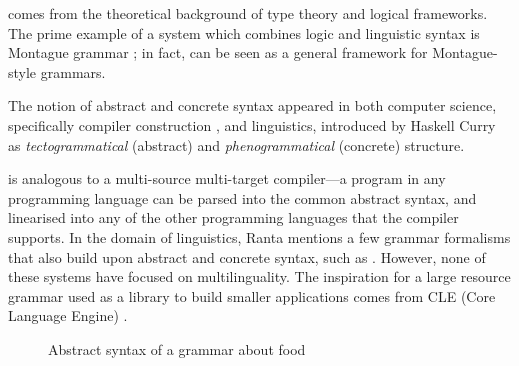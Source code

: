\gf{} comes from the theoretical background of type theory and logical
frameworks. The prime example of a system which combines logic and
linguistic syntax is Montague grammar \cite{montague}; in fact, \gf{}
can be seen as a general framework for Montague-style grammars.

The notion of abstract and concrete syntax appeared in both computer
science, specifically compiler construction \cite{mccarthy62}, and
linguistics, introduced by Haskell Curry \cite{curry1961} as
\emph{tectogrammatical} (abstract) and \emph{phenogrammatical}
(concrete) structure.

\gf{} is analogous to a multi-source multi-target compiler---a program
in any programming language can be parsed into the common abstract
syntax, and linearised into any of the other programming languages
that the compiler supports.  In the domain of linguistics, Ranta
\cite{ranta2011gfbook} mentions a few grammar formalisms that also
build upon abstract and concrete syntax, such as
\cite{deGroote2001acg,pollard2004hog,muskens2001lambda}. However, none
of these systems have focused on multilinguality.
The inspiration for a large resource grammar used as a library to
build smaller applications comes from  CLE (Core Language Engine)
\cite{CLE,cle2}.


\begin{figure}[h]
\centering

\begin{Shaded}
\begin{Highlighting}[]
 \FunctionTok{=} \NormalTok{\{}
  \FunctionTok{=}  \NormalTok{;}
     \NormalTok{; } \NormalTok{; } \NormalTok{; } \NormalTok{;}
    \OtherTok{ :}  \OtherTok{->}  \OtherTok{->}  \NormalTok{;                 }
    \NormalTok{, }\NormalTok{, }\NormalTok{, }\OtherTok{ :}  \OtherTok{->}  \NormalTok{;           }
    \OtherTok{ :}  \OtherTok{->}  \OtherTok{->}  \NormalTok{;                     }
    \NormalTok{, }\NormalTok{, }\NormalTok{, }\OtherTok{ :}  \NormalTok{;}
    \NormalTok{, }\NormalTok{, }\NormalTok{, }\OtherTok{ :}  \NormalTok{;}
\end{Highlighting}
\end{Shaded}
  \caption{Abstract syntax of a \gf{} grammar about food}
\label{fig:foods}
\end{figure}

